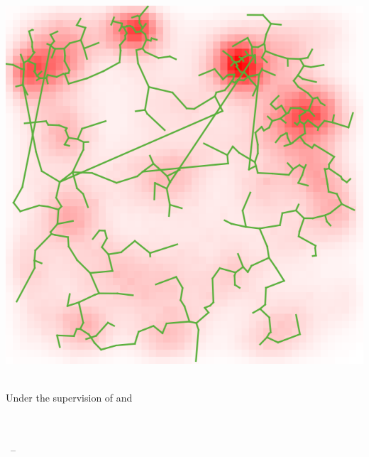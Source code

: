 
\begin{titlepage}

\begin{addmargin}[-1cm]{-3cm}
\begin{center}
\large

\hfill
\vfill

\begingroup
\color{Maroon}\spacedallcaps{\myTitle} \\ \bigskip %
\endgroup

\spacedlowsmallcaps{\myName} %

\vfill

\includegraphics[width=\textwidth]{Figures/Cover/cover} \\ \vspace{3cm} %

\mySubtitle \\ \medskip %
Under the supervision of \myProf and \myOtherProf \\ \medskip
\myDepartment \\  \medskip
\myFaculty \\  \bigskip

\myTime\ -- \myVersion %

\vfill

\end{center}
\end{addmargin}

\end{titlepage}